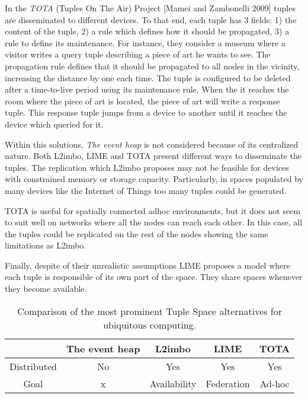 In the \emph{TOTA} (Tuples On The Air) Project [Mamei and Zambonelli 2009] tuples are disseminated to different devices. %
To that end, each tuple has 3 fields:
1) the content of the tuple,
2) a rule which defines how it should be propagated,
3) a rule to define its maintenance.
For instance, they consider a museum where a visitor writes a query tuple describing a piece of art he wants to see.
The propagation rule defines that it should be propagated to all nodes in the vicinity, increasing the distance by one each time.
The tuple is configured to be deleted after a time-to-live period using its maintenance rule.
When the it reaches the room where the piece of art is located, the piece of art will write a response tuple.
This response tuple jumps from a device to another until it reaches the device which queried for it.


\bigskip


Within this solutions, \emph{The event heap} is not considered because of its centralized nature.
Both L2imbo, LIME and TOTA present different ways to disseminate the tuples.
The replication which L2imbo proposes may not be feasible for devices with constrained memory or storage capacity.
Particularly, in spaces populated by many devices like the Internet of Things too many tuples could be generated.

TOTA is useful for spatially connected adhoc environments, but it does not seem to suit well on networks where all the nodes can reach each other.
In this case, all the tuples could be replicated on the rest of the nodes showing the same limitations as L2imbo.%

Finally, despite of their unrealistic assumptions LIME proposes a model where each tuple is responsible of its own part of the space.
They share spaces whenever they become available.


\begin{table}%
  \centering
  \begin{tabular}{c|cccc}%
      ~ & The event heap & L2imbo & LIME & TOTA \\
      \hline
      \hline
      Distributed & No & Yes & Yes & Yes \\
      Goal & x & Availability & Federation & Ad-hoc \\
  \end{tabular}
  \caption{Comparison of the most prominent Tuple Space alternatives for ubiquitous computing.} %
  \label{tab:myfirsttable}
\end{table}